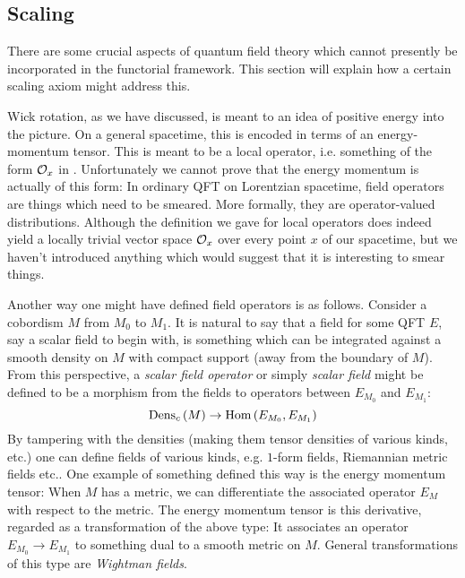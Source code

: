 \subsection{Scaling}
\label{sec:scaling}

There are some crucial aspects of quantum field theory which cannot presently be
incorporated in the functorial framework. 
This section will explain how a certain scaling axiom might address this. 

Wick rotation, as we have discussed, is meant to an idea of positive energy into the
picture. On a general spacetime, this is encoded in terms of an energy-momentum tensor.
This is meant to be a local operator, i.e. something of the form $\mathcal{O}_x$ in
. Unfortunately we cannot prove that the energy momentum is actually
of this form: In ordinary QFT on Lorentzian spacetime, field operators are things which
need to be smeared. More formally, they are operator-valued distributions. 
Although the definition we gave for local operators does indeed yield a locally
trivial vector space $\mathcal{O}_x$ over every point $x$ of our spacetime, but we haven't
introduced anything which would suggest that it is interesting to smear things. 

Another way one might have defined field operators is as follows.
Consider a cobordism $M$ from $M_0$ to $M_1$. 
It is natural to say that a field for some QFT $E$, say a scalar field to begin with,
is something which can be integrated against a smooth density on $M$ with compact
support (away from the boundary of $M$). 
From this perspective, a \emph{scalar field operator} or simply \emph{scalar field} might
be defined to be a morphism from the fields to operators between $E_{M_0}$ and $E_{M_1}$:
\begin{equation*}
\operatorname{Dens}_c\left(M\right) \to \operatorname{Hom}\left(E_{M_0} , E_{M_1} \right) 
\end{equation*}
By tampering with the densities (making them tensor densities of various kinds, etc.) one 
can define fields of various kinds, e.g. $1$-form fields, Riemannian metric fields etc..
One example of something defined this way is the energy momentum tensor:
When $M$ has a metric, we can differentiate the associated operator $E_{M}$ with respect
to the metric. The energy momentum tensor is this derivative, regarded as a transformation
of the above type: It associates an operator $E_{M_0}\to E_{M_1}$ to something dual to a
smooth metric on $M$.
General transformations of this type are \emph{Wightman fields}. 

